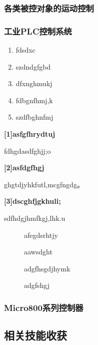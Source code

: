 \documentclass[12pt]{ctexart}
\begin{document}
\subsubsection{各类被控对象的运动控制}



\subsubsection{工业PLC控制系统}


\lipsum[1]

\leftboxbegin
\begin{enumerate}
  \item fdsdxc
  \item szdndgfgbd
  \item dfxnghmukj
  \item fdbgnfhmj,k
  \item szdfbghnfmj
\end{enumerate}
\leftboxend

\lipsum[1]
\lipsum[1]
\lipsum[1]





\textbf{[1]asfgfhrydtuj}

\qquad fdhgdasdfghjj;o



\textbf{[2]asfdgfhgj}

\qquad ghgtdjyhkfutl,mcgfngdg。

\textbf{[3]dscghfjgkhuli;}

\qquad sdfhdgjhmfkgj,lhk.u


\frameboxend

\lipsum[1]
\lipsum[1]

\begin{description}
  \item[] afegdsrhtjy
  \item[] aawsdght
  \item[] adgfhsgdjhymk
  \item[] adgfshgj
\end{description}

\subsubsection{Micro800系列控制器}

\lipsum[1]
\lipsum[1]

\subsection{相关技能收获}
\end{document}
